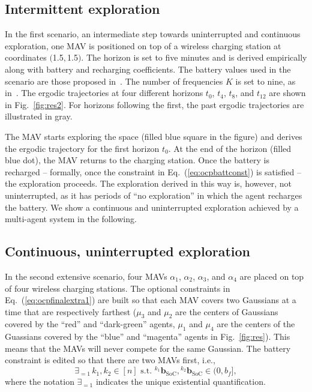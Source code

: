 \documentclass[letterpaper,10pt,conference,twoside]{IEEEtran}
\theoremstyle{definition}
\begin{document}
\subsection*{Intermittent exploration}
\noindent
In the first scenario, an intermediate step towards uninterrupted and continuous exploration, one MAV is positioned on top of a wireless charging station at coordinates $($1.5$,$1.5$)$. The horizon is set to five minutes and is derived empirically along with battery and recharging coefficients. The battery values used in the scenario are those proposed in~\cite{zhao2017observability}. The number of frequencies $K$ is set to nine, as in~\cite{calinon2020mixture}. The ergodic trajectories at four different horizons $t_0$, $t_4$, $t_8$, and $t_{12}$ are shown in Fig.~\ref{fig:res2}. For horizons following the first, the past ergodic trajectories are illustrated in gray.

The MAV starts exploring the space (filled blue square in the figure) and derives the ergodic trajectory for the first horizon $t_0$. At the end of the horizon (filled blue dot), the MAV returns to the charging station. Once the battery is recharged -- formally, once the constraint in Eq.~(\ref{eq:ocpbattconst}) is satisfied -- the exploration proceeds. The exploration derived in this way is, however, not uninterrupted, as it has periods of ``no exploration'' in which the agent recharges the battery. We show a continuous and uninterrupted exploration achieved by a multi-agent system in the following.

\subsection*{Continuous, uninterrupted exploration}
\noindent
In the second extensive scenario, four MAVs $\alpha_1$, $\alpha_2$, $\alpha_3$, and $\alpha_4$ are placed on top of four wireless charging stations. The optional constraints in Eq.~(\ref{eq:ocpfinalextra1}) are built so that each MAV covers two Gaussians at a time that are respectively farthest ($\mu_3$ and $\mu_2$ are the centers of Gaussians covered by the ``red'' and ``dark-green'' agents, $\mu_1$ and $\mu_4$ are the centers of the Guassians covered by the ``blue'' and ``magenta'' agents in Fig.~\ref{fig:res}). This means that the MAVs will never compete for the same Gaussian. The battery constraint is edited so that there are two MAVs first, i.e.,
\begin{equation}
\exists_{=1}\, k_1,k_2\in[n]\text{ s.t. }{}^{k_1} \mathbf{b}_{\text{SoC}},{}^{k_2} \mathbf{b}_{\text{SoC}}\in(0,b_f],
\end{equation} 
where the notation $\exists_{=1}$ indicates the unique existential quantification.
\end{document}
